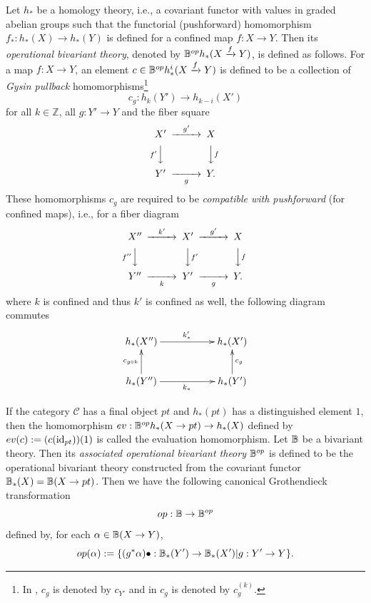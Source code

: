 \documentclass[a4paper]{amsart}
\begin{document}
Let $h_*$ be a homology theory, i.e., a covariant functor with values in graded abelian groups such that the functorial (pushforward) homomorphism $f_*:h_*(X) \to h_*(Y)$ is defined for a confined map $f:X \to Y$.  Then its \emph{operational bivariant theory}, denoted by $\mathbb B^{op}h_*(X \xrightarrow f Y)$, is defined as follows. For a map $f:X \to Y$, an element $c \in \mathbb B^{op}h_*^i(X \xrightarrow f Y)$ is defined to be a collection of
\emph{Gysin pullback} homomorphisms\footnote{In \cite[\S 8 \underline{Operational Theories}]{FM}, $c_g$ is denoted by $c_{Y'}$ and in \cite[\S 17. 1]{Ful} $c_g$ is denoted by $c^{(k)}_g$.}
\begin{equation*}
c_g:h_k(Y') \to h_{k-i}(X')
\end{equation*}
for all $k \in \mathbb Z$, all $g:Y' \to Y$ and the fiber square \, \, \, 
$$\CD
X' @> {g'}  >> X\\
@V {f'} VV @VV fV\\
Y' @>> {g} > Y.\\
\endCD
$$
These homomorphisms $c_g$ are
required to be \emph{compatible with pushforward} (for confined maps), i.e., for a fiber diagram
\, \, \, 
$$\CD
X'' @> {k'}  >> X' @> {g'}  >> X\\
@V {f''} VV @VV f'V @VV fV\\
Y'' @>> {k} > Y' @>> {g} > Y.\\
\endCD
$$
where $k$ is confined and thus $k'$ is confined as well, 
the following diagram commutes
\begin{equation}
\xymatrix
{h_*(X'')  \ar[rr]^{k'_*} && h_*(X')\\
h_*(Y'') \ar[u]^{c_{g\circ k}}  \ar[rr]_{k_*} && h_*(Y') \ar[u]_{c_g}
}
\end{equation}

If the category $\mathscr C$ has a final object $pt$ and $h_*(pt)$ has a distinguished element $1$, then the homomorphism $ev:\mathbb B^{op}h_*(X \to pt) \to h_*(X)$ defined by $ev(c) := (c(\operatorname{id}_{pt}))(1)$ is called the evaluation homomorphism.
Let $\mathbb B$ be a bivariant theory. Then its \emph{associated operational bivariant theory} $\mathbb B^{op}$ is defined to be the operational bivariant theory constructed from the covariant functor $\mathbb B_*(X) = \mathbb B(X \to pt)$. Then we have the following canonical Grothendieck transformation
$$ op:\mathbb B \to \mathbb B^{op}$$
defined by, for each $\alpha \in \mathbb B(X \to Y)$,
$$
op(\alpha):= \{ (g^*\alpha) \bullet : \mathbb B_*(Y') \to \mathbb B_*(X') | g:Y' \to Y \}.
$$
\end{document}
